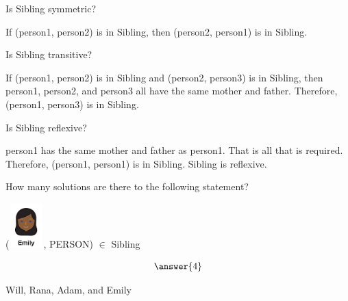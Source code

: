 \documentclass{ximera}
\begin{document}
\begin{exercise}
Is Sibling symmetric?

  \begin{multipleChoice}
  \end{multipleChoice}
  \begin{feedback}
If (person1, person2) is in Sibling, then (person2, person1) is in Sibling.
  \end{feedback}
\end{exercise}





\begin{exercise}
Is Sibling transitive?

  \begin{multipleChoice}
  \end{multipleChoice}
  \begin{feedback}
If (person1, person2) is in Sibling and (person2, person3) is in Sibling, then person1, person2, and person3 all have the same mother and father. Therefore, (person1, person3) is in Sibling.
  \end{feedback}
\end{exercise}




\begin{exercise}
Is Sibling reflexive?

  \begin{multipleChoice}
  \end{multipleChoice}
  \begin{feedback}
  person1 has the same mother and father as person1.  That is all that is required.  Therefore, (person1, person1) is in Sibling. Sibling is reflexive.
  \end{feedback}
\end{exercise}



\begin{exercise}
How many solutions are there to the following statement?  

({\includegraphics[width=50px,height=65px]{pics/people/emily.png}}, PERSON) $\in$ Sibling 

\[  \answer{4} \]

  \begin{feedback}
Will, Rana, Adam, and Emily
  \end{feedback}
\end{exercise}
\end{document}
